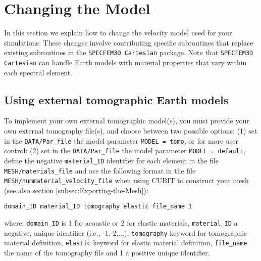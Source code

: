 \chapter{Changing the Model}\label{cha:-Changing-the}

In this section we explain how to change the velocity model used for
your simulations. These changes involve contributing specific subroutines
that replace existing subroutines in the \texttt{SPECFEM3D Cartesian}
package. Note that \texttt{SPECFEM3D Cartesian} can handle Earth models
with material properties that vary within each spectral element.


\section{Using external tomographic Earth models}\label{sec:Using-tomographic}

To implement your own external tomographic model(s), you must provide
your own external tomography file(s), and choose between two possible
options:\newline
 \indent (1) set in the \texttt{DATA/Par\_file} the model parameter \texttt{MODEL
= tomo}, \newline
 or for more user control: \newline
 \indent (2) set in the \texttt{DATA/Par\_file} the model parameter \texttt{MODEL
= default}, define the negative \texttt{material\_ID} identifier for
each element in the file \texttt{MESH/materials\_file} and use the
following format in the file \newline
\texttt{MESH/nummaterial\_velocity\_file}
when using CUBIT to construct your mesh (see also section \ref{subsec:Exporting-the-Mesh}):
\begin{verbatim}
domain_ID material_ID tomography elastic file_name 1
\end{verbatim}
where: \newline
 \indent \texttt{domain\_ID} is 1 for acoustic or 2 for elastic materials,
\newline
 \indent \texttt{material\_ID} a negative, unique identifier (i.e.,
-1,-2,...), \newline
 \indent \texttt{tomography} keyword for tomographic material definition,
\newline
 \indent \texttt{elastic} keyword for elastic material definition,
\newline
 \indent \texttt{file\_name} the name of the tomography file and
1 a positive unique identifier.\newline


